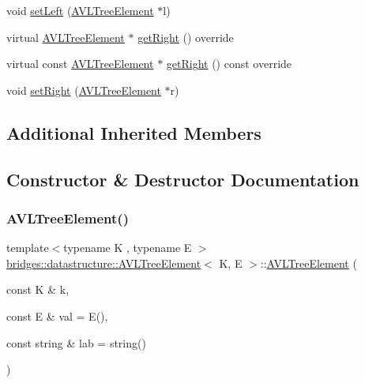\begin{DoxyCompactItemize}
\item 
void \mbox{\hyperlink{classbridges_1_1datastructure_1_1_a_v_l_tree_element_af6c8a71789ff45481786fd4d63cbbcbe}{set\+Left}} (\mbox{\hyperlink{classbridges_1_1datastructure_1_1_a_v_l_tree_element}{A\+V\+L\+Tree\+Element}} $\ast$l)
\item 
virtual \mbox{\hyperlink{classbridges_1_1datastructure_1_1_a_v_l_tree_element}{A\+V\+L\+Tree\+Element}} $\ast$ \mbox{\hyperlink{classbridges_1_1datastructure_1_1_a_v_l_tree_element_aed585fdf56fcbfebac6cd0262c9c1807}{get\+Right}} () override
\item 
virtual const \mbox{\hyperlink{classbridges_1_1datastructure_1_1_a_v_l_tree_element}{A\+V\+L\+Tree\+Element}} $\ast$ \mbox{\hyperlink{classbridges_1_1datastructure_1_1_a_v_l_tree_element_a5a2c4b96b51da1daa3c0426882250acb}{get\+Right}} () const override
\item 
void \mbox{\hyperlink{classbridges_1_1datastructure_1_1_a_v_l_tree_element_a8ef25fb87bcce418541adccb17cbee80}{set\+Right}} (\mbox{\hyperlink{classbridges_1_1datastructure_1_1_a_v_l_tree_element}{A\+V\+L\+Tree\+Element}} $\ast$r)
\end{DoxyCompactItemize}
\subsection*{Additional Inherited Members}


\subsection{Constructor \& Destructor Documentation}
\mbox{\label{classbridges_1_1datastructure_1_1_a_v_l_tree_element_a611fc818eeb478e330ef585adcefd9e6}} 
\subsubsection{\texorpdfstring{A\+V\+L\+Tree\+Element()}{AVLTreeElement()}}
{\footnotesize\ttfamily template$<$typename K , typename E $>$ \\
\mbox{\hyperlink{classbridges_1_1datastructure_1_1_a_v_l_tree_element}{bridges\+::datastructure\+::\+A\+V\+L\+Tree\+Element}}$<$ K, E $>$\+::\mbox{\hyperlink{classbridges_1_1datastructure_1_1_a_v_l_tree_element}{A\+V\+L\+Tree\+Element}} (\begin{DoxyParamCaption}\item[{const K \&}]{k,  }\item[{const E \&}]{val = {\ttfamily E()},  }\item[{const string \&}]{lab = {\ttfamily string()} }\end{DoxyParamCaption})\hspace{0.3cm}{\ttfamily [inline]}}

